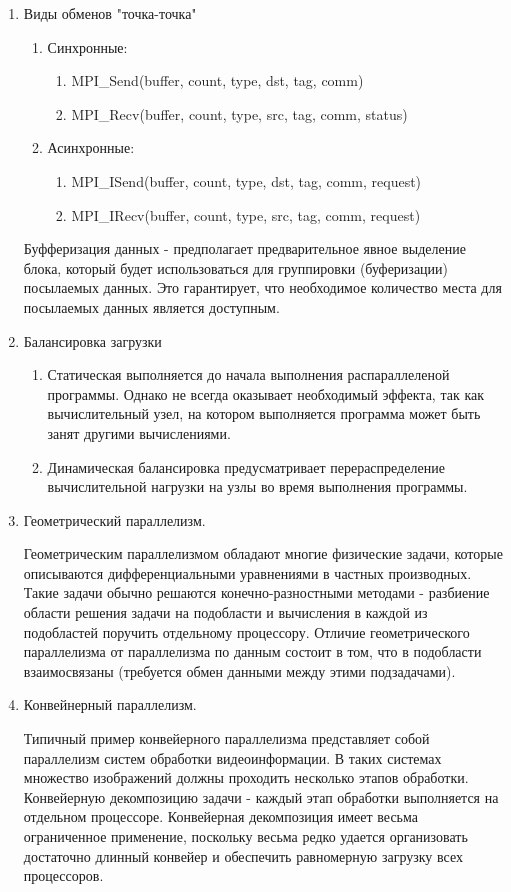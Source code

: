 \documentclass[a4paper]{article}
\begin{document}
\begin{enumerate}
\item Виды обменов "точка-точка"
		\begin{enumerate}
			\item Синхронные:
				\begin{enumerate}
					\item MPI\_Send(buffer, count, type, dst, tag, comm) 
					\item MPI\_Recv(buffer, count, type, src, tag, comm, status) 
				\end{enumerate}
			\item Асинхронные:
				\begin{enumerate}
					\item MPI\_ISend(buffer, count, type, dst, tag, comm, request) 
					\item MPI\_IRecv(buffer, count, type, src, tag, comm, request) 
				\end{enumerate}
		\end{enumerate}
		Буфферизация данных - предполагает предварительное явное выделение блока, 
		который будет использоваться для группировки (буферизации) посылаемых данных. 
		Это гарантирует, что необходимое количество места для посылаемых данных является доступным.
\item Балансировка загрузки
\begin{enumerate}
	\item Статическая выполняется до начала выполнения распараллеленой программы. 
	Однако не всегда оказывает необходимый эффекта, так как вычислительный узел, на котором выполняется программа может быть занят другими вычислениями.

	\item Динамическая балансировка предусматривает перераспределение вычислительной
	 нагрузки на узлы во время выполнения программы.
\end{enumerate}

\item Геометрический параллелизм. \par
Геометрическим параллелизмом обладают многие физические задачи, которые описываются дифференциальными уравнениями в частных производных. Такие задачи обычно решаются конечно-разностными методами -
разбиение области решения задачи на подобласти и вычисления в каждой из подобластей поручить отдельному процессору. Отличие геометрического параллелизма от параллелизма по данным состоит в том, что в подобласти 
взаимосвязаны (требуется обмен данными между этими подзадачами).

\item Конвейнерный параллелизм. \par
Типичный пример конвейерного параллелизма представляет собой параллелизм систем обработки видеоинформации. В таких системах множество изображений должны проходить несколько этапов обработки.
Конвейерную декомпозицию задачи - каждый этап обработки выполняется на отдельном процессоре.
Конвейерная декомпозиция имеет весьма ограниченное применение, поскольку весьма редко удается организовать достаточно длинный конвейер и обеспечить равномерную загрузку всех процессоров.




\end{enumerate}
\end{document}
